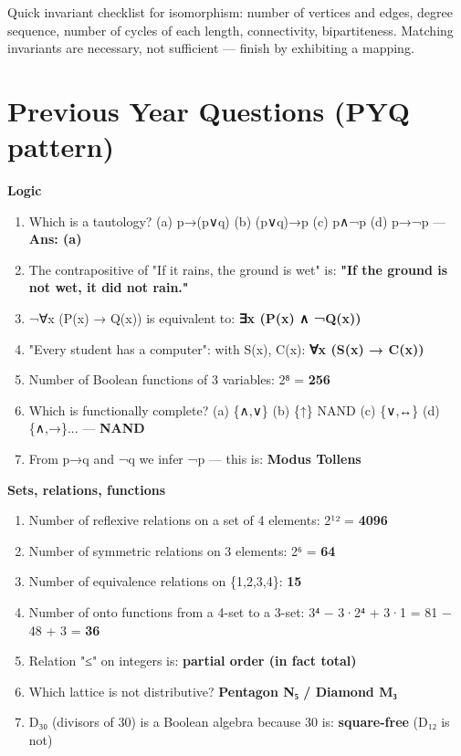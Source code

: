 Quick invariant checklist for isomorphism: number of vertices and edges, degree sequence, number of cycles of each length, connectivity, bipartiteness. Matching invariants are necessary, not sufficient --- finish by exhibiting a mapping.

\needspace{125pt}

\hypertarget{p2-01--previous-year-questions-pyq-pattern}{%
\section{Previous Year Questions (PYQ pattern)}\label{p2-01--previous-year-questions-pyq-pattern}}

\textbf{Logic}

\begin{enumerate}
\def\labelenumi{\arabic{enumi}.}
\tightlist
\item
  Which is a tautology? (a) p→(p∨q) (b) (p∨q)→p (c) p∧¬p (d) p→¬p --- \textbf{Ans: (a)}
\item
  The contrapositive of "If it rains, the ground is wet" is: \textbf{"If the ground is not wet, it did not rain."}
\item
  ¬∀x (P(x) → Q(x)) is equivalent to: \textbf{∃x (P(x) ∧ ¬Q(x))}
\item
  "Every student has a computer": with S(x), C(x): \textbf{∀x (S(x) → C(x))}
\item
  Number of Boolean functions of 3 variables: 2⁸ = \textbf{256}
\item
  Which is functionally complete? (a) \{∧,∨\} (b) \{↑\} NAND (c) \{∨,↔\} (d) \{∧,→\}... --- \textbf{NAND}
\item
  From p→q and ¬q we infer ¬p --- this is: \textbf{Modus Tollens}
\end{enumerate}

\textbf{Sets, relations, functions}

\begin{enumerate}
\def\labelenumi{\arabic{enumi}.}
\setcounter{enumi}{7}
\tightlist
\item
  Number of reflexive relations on a set of 4 elements: 2¹² = \textbf{4096}
\item
  Number of symmetric relations on 3 elements: 2⁶ = \textbf{64}
\item
  Number of equivalence relations on \{1,2,3,4\}: \textbf{15}
\item
  Number of onto functions from a 4-set to a 3-set: 3⁴ − 3·2⁴ + 3·1 = 81 − 48 + 3 = \textbf{36}
\item
  Relation "≤" on integers is: \textbf{partial order (in fact total)}
\item
  Which lattice is not distributive? \textbf{Pentagon N₅ / Diamond M₃}
\item
  D₃₀ (divisors of 30) is a Boolean algebra because 30 is: \textbf{square-free} (D₁₂ is not)
\end{enumerate}

